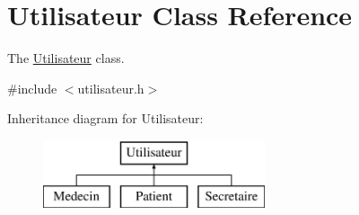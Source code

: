 \hypertarget{class_utilisateur}{}\section{Utilisateur Class Reference}
\label{class_utilisateur}


The \mbox{\hyperlink{class_utilisateur}{Utilisateur}} class.  




{\ttfamily \#include $<$utilisateur.\+h$>$}

Inheritance diagram for Utilisateur\+:\begin{figure}[H]
\begin{center}
\leavevmode
\includegraphics[height=2.000000cm]{class_utilisateur}
\end{center}
\end{figure}
